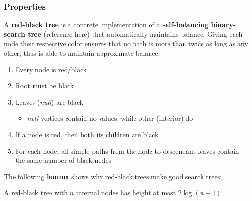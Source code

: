 \documentclass[10pt, 
a4paper, 
oneside, 
headinclude, footinclude, 
BCOR5mm]
{scrartcl}
\begin{document}
\subsubsection{Properties}
A \textbf{red-black tree} is a concrete implementation of a \textbf{self-balancing binary-search tree} (reference here) that automatically maintains balance. 
Giving each node their respective color ensures that no path is more than twice as long as any other, thus is able to maintain approximate balance.\
\begin{enumerate}
    \item Every node is {\color{red}red}/black
    \item Root must be black
    \item Leaves (\textit{null}) are black
    \begin{itemize}
        \item \textit{null} vertices contain no values, while other (interior) do
    \end{itemize}
    \item If a node is {\color{red}red}, then both its children are black
    \item For each node, all simple paths from the node to descendant leaves contain the same number of black nodes 
\end{enumerate}
The following \textbf{lemma} shows why red-black trees make good search trees:
\begin{lemma}
    A red-black tree with $n$ internal nodes has height at most $2\log (n+1)$
\end{lemma}
\end{document}
